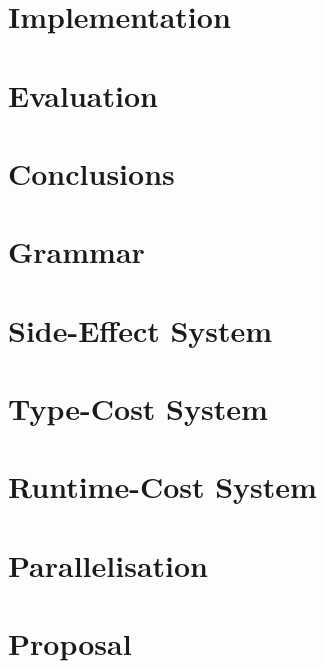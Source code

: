\documentclass[12pt,a4paper,twoside,openright]{report}
\begin{document}
\chapter{Implementation}


\chapter{Evaluation}


\chapter{Conclusions}



\newpage

\printbibliography


\appendix


\chapter{Grammar}



\newpage

\chapter{Side-Effect System}



\newpage

\chapter{Type-Cost System}



\newpage

\chapter{Runtime-Cost System}



\newpage

\chapter{Parallelisation}



\newpage

\chapter{Proposal}



\end{document}
